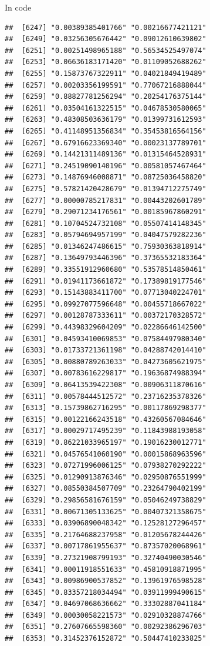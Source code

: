 \documentclass[ignorenonframetext,]{beamer}
\begin{document}
\begin{frame}[fragile]{In code}
\begin{verbatim}
##  [6247] "0.00389385401766" "0.00216677421121"
##  [6249] "0.03256305676442" "0.09012610639802"
##  [6251] "0.00251498965188" "0.56534525497074"
##  [6253] "0.06636183171420" "0.01109052688262"
##  [6255] "0.15873767322911" "0.04021849419489"
##  [6257] "0.00203356199591" "0.77067216888044"
##  [6259] "0.88827781256294" "0.20254176375144"
##  [6261] "0.03504161322515" "0.04678530580065"
##  [6263] "0.48308503636179" "0.01399731612593"
##  [6265] "0.41148951356834" "0.35453816564156"
##  [6267] "0.67916623369340" "0.00023137789701"
##  [6269] "0.14421311489136" "0.01315464528931"
##  [6271] "0.24519090140196" "0.00581057467464"
##  [6273] "0.14876946008871" "0.08725036458820"
##  [6275] "0.57821420428679" "0.01394712275749"
##  [6277] "0.00000785217831" "0.00443202601789"
##  [6279] "0.29071234176561" "0.00185967860291"
##  [6281] "0.10704524732108" "0.05507414148345"
##  [6283] "0.05794694957199" "0.04047579282236"
##  [6285] "0.01346247486615" "0.75930363818914"
##  [6287] "0.13649793446396" "0.37365532183364"
##  [6289] "0.33551912960680" "0.53578514850461"
##  [6291] "0.01941173661872" "0.17389819177546"
##  [6293] "0.15143883411700" "0.07713040224701"
##  [6295] "0.09927077596648" "0.00455718667022"
##  [6297] "0.00128787333611" "0.00372170328572"
##  [6299] "0.44398329604209" "0.02286646142500"
##  [6301] "0.04593410069853" "0.07584497980340"
##  [6303] "0.01733721361198" "0.04288742014410"
##  [6305] "0.00880789263033" "0.04273605621975"
##  [6307] "0.00783616229817" "0.19636874988394"
##  [6309] "0.06413539422308" "0.00906311870616"
##  [6311] "0.00578444512572" "0.23716235378326"
##  [6313] "0.15739862716295" "0.00117869298377"
##  [6315] "0.00122166243518" "0.43260567084646"
##  [6317] "0.00029717495239" "0.11843988193058"
##  [6319] "0.86221033965197" "0.19016230012771"
##  [6321] "0.04576541060190" "0.00015868963596"
##  [6323] "0.07271996006125" "0.07938270292222"
##  [6325] "0.01290913876346" "0.02950876551999"
##  [6327] "0.08550384507709" "0.23264790402199"
##  [6329] "0.29856581676159" "0.05046249738829"
##  [6331] "0.00671305133625" "0.00407321358675"
##  [6333] "0.03906890048342" "0.12528127296457"
##  [6335] "0.21764688237958" "0.01205678244426"
##  [6337] "0.00717861955637" "0.87357020068961"
##  [6339] "0.27321908799193" "0.32740490030546"
##  [6341] "0.00011918551633" "0.45810918871995"
##  [6343] "0.00986900537852" "0.13961976598528"
##  [6345] "0.83357218034494" "0.03911999490615"
##  [6347] "0.04697068636662" "0.33302887041184"
##  [6349] "0.00030058221573" "0.02910328874766"
##  [6351] "0.27607665598360" "0.00292386296703"
##  [6353] "0.31452376152872" "0.50447410233825"

\end{verbatim}
\end{frame}
\end{document}
